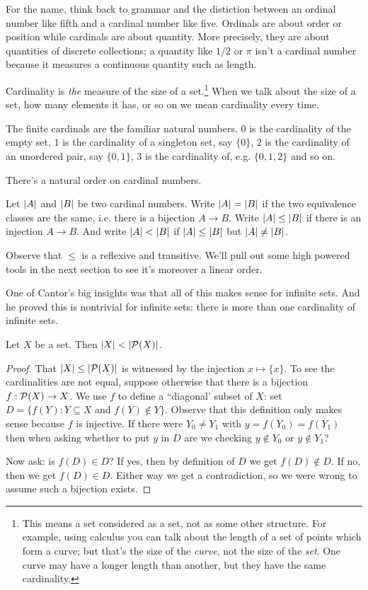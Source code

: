 \documentclass[10pt]{amsart}
\begin{document}
For the name, think back to grammar and the distiction between an ordinal number like fifth and a cardinal number like five. Ordinals are about order or position while cardinals are about quantity. More precisely, they are about quantities of discrete collections; a quantity like $1/2$ or $\pi$ isn't a cardinal number because it measures a continuous quantity such as length.

Cardinality is \emph{the} measure of the size of a set.\footnote{This means a set considered as a set, not as some other structure. For example, using calculus you can talk about the length of a set of points which form a curve; but that's the size of the \textit{curve}, not the size of the \textit{set}. One curve may have a longer length than another, but they have the same cardinality.} 
When we talk about the size of a set, how many elements it has, or so on we mean cardinality every time.

The finite cardinals are the familiar natural numbers. $0$ is the cardinality of the empty set, $1$ is the cardinality of a singleton set, say $\{0\}$, $2$ is the cardinality of an unordered pair, say $\{0,1\}$, $3$ is the cardinality of, e.g. $\{0,1,2\}$ and so on.

There's a natural order on cardinal numbers.

\begin{definition}
Let $\left\lvert A \right\rvert$ and $\left\lvert B \right\rvert$ be two cardinal numbers. Write $\left\lvert A \right\rvert = \left\lvert B \right\rvert$ if the two equivalence classes are the same, i.e. there is a bijection $A \to B$. Write $\left\lvert A \right\rvert \le \left\lvert B \right\rvert$ if there is an injection $A \to B$. And write $\left\lvert A \right\rvert < \left\lvert B \right\rvert$ if $\left\lvert A \right\rvert \le \left\lvert B \right\rvert$ but $\left\lvert A \right\rvert \ne \left\lvert B \right\rvert$.
\end{definition}

Observe that $\le$ is a reflexive and transitive. We'll pull out some high powered tools in the next section to see it's moreover a linear order.
\smallskip

One of Cantor's big insights was that all of this makes sense for infinite sets. And he proved this is nontrivial for infinite sets: there is more than one cardinality of infinite sets.

\begin{theorem}[Cantor]
Let $X$ be a set. Then $\left\lvert X \right\rvert < \left\lvert \mathcal{P}(X) \right\rvert$.
\end{theorem}

\begin{proof}
That $\left\lvert X \right\rvert \le \left\lvert \mathcal{P}(X) \right\rvert$ is witnessed by the injection $x \mapsto \{x\}$. To see the cardinalities are not equal, suppose otherwise that there is a bijection $f : \mathcal{P}(X) \to X$. We use $f$ to define a ``diagonal' subset of $X$: set $D = \{ f(Y): Y \subseteq X$ and $f(Y) \not \in Y\}$. Observe that this definition only makes sense because $f$ is injective. If there were $Y_0 \ne Y_1$ with $y = f(Y_0) = f(Y_1)$ then when asking whether to put $y$ in $D$ are we checking $y \not \in Y_0$ or $y \not \in Y_1$? 

Now ask: is $f(D) \in D$? If yes, then by definition of $D$ we get $f(D) \not \in D$. If no, then we get $f(D) \in D$. Either way we get a contradiction, so we were wrong to assume such a bijection exists.
\end{proof}
\end{document}
